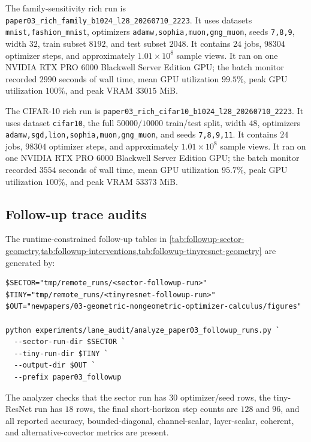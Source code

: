 The family-sensitivity rich run is
\texttt{paper03\_rich\_family\_b1024\_l28\_20260710\_2223}.  It uses datasets
\texttt{mnist,fashion\_mnist}, optimizers
\texttt{adamw,sophia,muon,gng\_muon}, seeds \texttt{7,8,9}, width $32$,
train subset $8192$, and test subset $2048$.  It contains $24$ jobs,
$98304$ optimizer steps, and approximately $1.01\times10^8$ sample views.  It
ran on one NVIDIA RTX PRO 6000 Blackwell Server Edition GPU; the batch
monitor recorded $2990$ seconds of wall time, mean GPU utilization $99.5\%$,
peak GPU utilization $100\%$, and peak VRAM $33015$ MiB.

The CIFAR-10 rich run is
\texttt{paper03\_rich\_cifar10\_b1024\_l28\_20260710\_2223}.  It uses dataset
\texttt{cifar10}, the full $50000/10000$ train/test split, width $48$,
optimizers \texttt{adamw,sgd,lion,sophia,muon,gng\_muon}, and seeds
\texttt{7,8,9,11}.  It contains $24$ jobs, $98304$ optimizer steps, and
approximately $1.01\times10^8$ sample views.  It ran on one NVIDIA RTX PRO
6000 Blackwell Server Edition GPU; the batch monitor recorded $3554$ seconds
of wall time, mean GPU utilization $95.7\%$, peak GPU utilization $100\%$,
and peak VRAM $53373$ MiB.

\subsection{Follow-up trace audits}

The runtime-constrained follow-up tables in
\cref{tab:followup-sector-geometry,tab:followup-interventions,tab:followup-tinyresnet-geometry}
are generated by:
\begin{verbatim}
$SECTOR="tmp/remote_runs/<sector-followup-run>"
$TINY="tmp/remote_runs/<tinyresnet-followup-run>"
$OUT="newpapers/03-geometric-nongeometric-optimizer-calculus/figures"

python experiments/lane_audit/analyze_paper03_followup_runs.py `
  --sector-run-dir $SECTOR `
  --tiny-run-dir $TINY `
  --output-dir $OUT `
  --prefix paper03_followup
\end{verbatim}
The analyzer checks that the sector run has $30$ optimizer/seed rows, the
tiny-ResNet run has $18$ rows, the final short-horizon step counts are
$128$ and $96$, and all reported accuracy, bounded-diagonal, channel-scalar,
layer-scalar, coherent, and alternative-covector metrics are present.

\begin{table}[t]
\centering
\caption{Synthetic residual sanity check used before the neural-network
follow-up audits.  Raw TGER allows the explaining geometry to vary by step;
coherent TGER uses one shared explaining map across the trace.}
\label{tab:appendix-followup-synthetic-sanity}
\small

\end{table}

